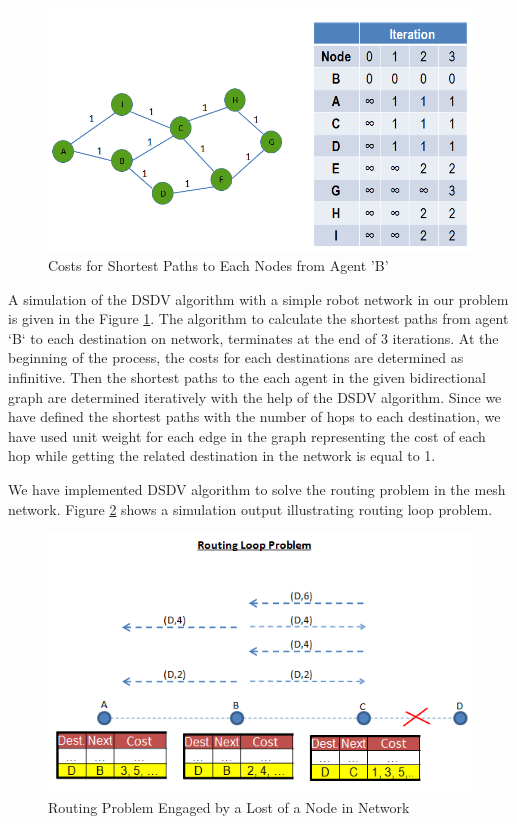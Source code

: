 \begin{figure}[H]
\caption{Costs for Shortest Paths to Each Nodes from Agent 'B'} \label{bellman_ref}
\centering
\includegraphics[scale = 0.50]{bellman}
\end{figure}

A simulation of the DSDV algorithm with a simple robot network in our problem is given in the Figure \ref{bellman_ref}. The algorithm to calculate the shortest paths from agent `B` to each destination on network, terminates at the end of 3 iterations. At the beginning of the process, the costs for each destinations are determined as infinitive. Then the shortest paths to the each agent in the given bidirectional graph are determined iteratively with the help of the DSDV algorithm. Since we have defined the shortest paths with the number of hops to each destination, we have used unit weight for each edge in the graph representing the cost of each hop while getting the related destination in the network is equal to 1. 

We have implemented DSDV algorithm to solve the routing problem in the mesh network. Figure \ref{routing_problem2} shows a simulation output illustrating routing loop problem.

\begin{figure}[H] 
\caption{Routing Problem Engaged by a Lost of a Node in Network} \label{routing_problem2}
\centering
\includegraphics[scale = 0.65]{routing_problem}
\end{figure}

